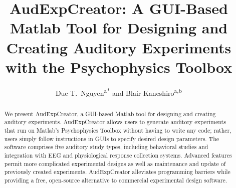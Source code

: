 \documentclass[preprint,12pt, a4paper]{elsarticle}
\begin{document}
\newcommand{\red}[1]{\textcolor{red}{#1}}

\begin{frontmatter}



\title{Aud{E}xp{C}reator: A {GUI}-Based Matlab Tool for Designing and Creating Auditory Experiments with the {P}sychophysics {T}oolbox}


\author{Duc T.~Nguyen\textsuperscript{a*} and Blair Kaneshiro\textsuperscript{a,b}}

\address{\textsuperscript{a}Center for the Study of Language and Information, Stanford University, Stanford, CA 94305 USA\\
\textsuperscript{b}Center for Computer Research in Music and Acoustics, Stanford University, Stanford, CA 94305 USA\\
\textsuperscript{*}Corresponding email: dtn006@ccrma.stanford.edu}

\begin{abstract}
We present AudExpCreator, a GUI-based Matlab tool for designing and creating auditory experiments.  AudExpCreator allows users to generate auditory experiments that run on Matlab's Psychophysics Toolbox without having to write any code; rather, users simply follow instructions in GUIs to specify desired design parameters. The software comprises five auditory study types, including behavioral studies and integration with EEG and physiological response collection systems. Advanced features permit more complicated experimental designs as well as maintenance and update of previously created experiments. AudExpCreator alleviates programming barriers while providing a free, open-source alternative to commercial experimental design software.
\end{abstract}


\end{frontmatter}
\end{document}
